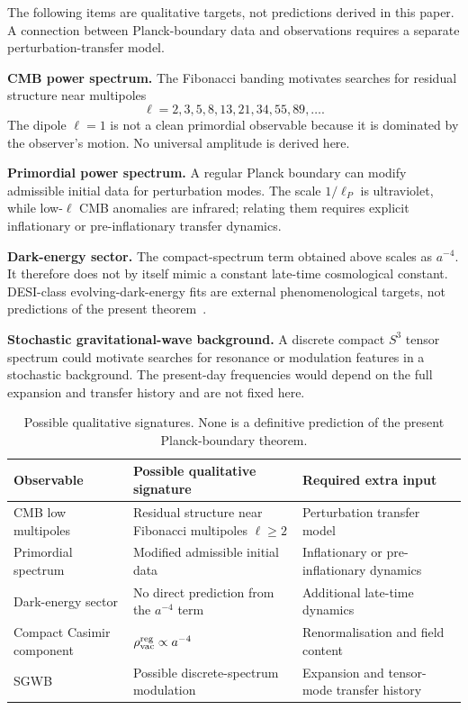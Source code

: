 \documentclass[reprint,aps,prd,letterpaper,superscriptaddress,nofootinbib,longbibliography,floatfix]{revtex4-2}
\theoremstyle{remark}
\begin{document}
The following items are qualitative targets, not predictions derived in this
paper.  A connection between Planck-boundary data and observations requires a
separate perturbation-transfer model.

\medskip
\noindent\textbf{CMB power spectrum.}
The Fibonacci banding motivates searches for residual structure near multipoles
\[
  \ell=2,3,5,8,13,21,34,55,89,\ldots .
\]
The dipole \(\ell=1\) is not a clean primordial observable because it is
dominated by the observer's motion.  No universal amplitude is derived here.

\medskip
\noindent\textbf{Primordial power spectrum.}
A regular Planck boundary can modify admissible initial data for perturbation
modes.  The scale \(1/\ell_P\) is ultraviolet, while low-\(\ell\) CMB anomalies
are infrared; relating them requires explicit inflationary or pre-inflationary
transfer dynamics.

\medskip
\noindent\textbf{Dark-energy sector.}
The compact-spectrum term obtained above scales as \(a^{-4}\).  It therefore
does not by itself mimic a constant late-time cosmological constant.  DESI-class
evolving-dark-energy fits are external phenomenological targets, not predictions
of the present theorem~\cite{DESI}.

\medskip
\noindent\textbf{Stochastic gravitational-wave background.}
A discrete compact \(S^3\) tensor spectrum could motivate searches for resonance
or modulation features in a stochastic background.  The present-day frequencies
would depend on the full expansion and transfer history and are not fixed here.

\begin{table}[!tbp]
\centering
\small
\renewcommand{\arraystretch}{1.25}
\caption{Possible qualitative signatures.  None is a definitive prediction of
the present Planck-boundary theorem.}
\label{tab:signatures}
\begin{tabular}{p{}p{}p{}}
\toprule
Observable & Possible qualitative signature & Required extra input\\
\midrule
CMB low multipoles & Residual structure near Fibonacci multipoles \(\ell\ge2\) &
Perturbation transfer model\\
Primordial spectrum & Modified admissible initial data & Inflationary or pre-inflationary dynamics\\
Dark-energy sector & No direct prediction from the \(a^{-4}\) term & Additional late-time dynamics\\
Compact Casimir component & \(\rho_{\rm vac}^{\rm reg}\propto a^{-4}\) &
Renormalisation and field content\\
SGWB & Possible discrete-spectrum modulation & Expansion and tensor-mode transfer history\\
\bottomrule
\end{tabular}
\end{table}
\end{document}
